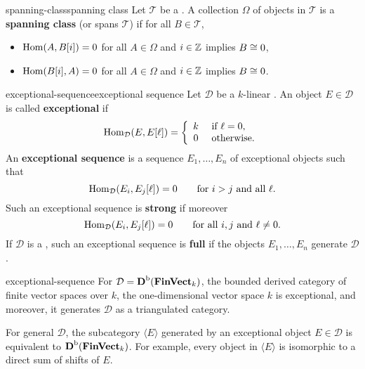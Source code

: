 \begin{topic}{spanning-class}{spanning class}
    Let $\mathcal{T}$ be a . A collection $\Omega$ of objects in $\mathcal{T}$ is a \textbf{spanning class} (or spans $\mathcal{T}$) if for all $B \in \mathcal{T}$,
    \begin{itemize}
        \item $\operatorname{Hom}(A, B[i]) = 0$ for all $A \in \Omega$ and $i \in \mathbb{Z}$ implies $B \cong 0$,
        \item $\operatorname{Hom}(B[i], A) = 0$ for all $A \in \Omega$ and $i \in \mathbb{Z}$ implies $B \cong 0$.
    \end{itemize}
\end{topic}

\begin{topic}{exceptional-sequence}{exceptional sequence}
    Let $\mathcal{D}$ be a $k$-linear . An object $E \in \mathcal{D}$ is called \textbf{exceptional} if
    \[ \operatorname{Hom}_\mathcal{D}(E, E[\ell]) = \left\{\begin{array}{cl} k & \text{ if } \ell = 0, \\ 0 & \text{ otherwise.} \end{array}\right. \]
    An \textbf{exceptional sequence} is a sequence $E_1, \ldots, E_n$ of exceptional objects such that
    \[ \operatorname{Hom}_\mathcal{D}(E_i, E_j[\ell]) = 0 \qquad \textup{for $i > j$ and all $\ell$}. \]
    Such an exceptional sequence is \textbf{strong} if moreover
    \[ \operatorname{Hom}_\mathcal{D}(E_i, E_j[\ell]) = 0 \qquad \textup{for all $i, j$ and $\ell \ne 0$}. \]
    If $\mathcal{D}$ is a , such an exceptional sequence is \textbf{full} if the objects $E_1, \ldots, E_n$ generate $\mathcal{D}$.
\end{topic}


\begin{example}{exceptional-sequence}
    For $\mathcal{D} = \textbf{D}^\textup{b}(\textbf{FinVect}_k)$, the bounded derived category of finite vector spaces over $k$, the one-dimensional vector space $k$ is exceptional, and moreover, it generates $\mathcal{D}$ as a triangulated category.

    For general $\mathcal{D}$, the subcategory $\langle E \rangle$ generated by an exceptional object $E \in \mathcal{D}$ is equivalent to $\textbf{D}^\textup{b}(\textbf{FinVect}_k)$. For example, every object in $\langle E \rangle$ is isomorphic to a direct sum of shifts of $E$.
\end{example}

